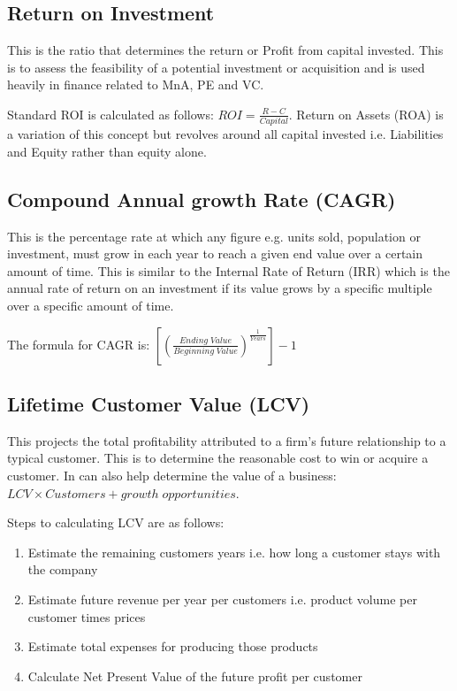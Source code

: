 \documentclass[a4paper]{article}
\begin{document}
{\subsection{Return on Investment}
This is the ratio that determines the return or Profit from capital invested. This is to assess the feasibility of a potential investment or acquisition and is used heavily in finance related to MnA, PE and VC.

\vspace{5pt}
\noindent Standard ROI is calculated as follows: $ROI = \frac{R-C}{Capital}$. Return on Assets (ROA) is a variation of this concept but revolves around all capital invested i.e. Liabilities and Equity rather than equity alone.

\subsection{Compound Annual growth Rate (CAGR)}
This is the percentage rate at which any figure e.g. units sold, population or investment, must grow in each year to reach a given end value over a certain amount of time. This is similar to the Internal Rate of Return (IRR) which is the annual rate of return on an investment if its value grows by a specific multiple over a specific amount of time.

\vspace{5pt}
\noindent The formula for CAGR is: $[(\frac{Ending\; Value}{Beginning\; Value})^{\frac{1}{Years}}]-1$

\subsection{Lifetime Customer Value (LCV)}
This projects the total profitability attributed to a firm's future relationship to a typical customer. This is to determine the reasonable cost to win or acquire a customer. In can also help determine the value of a business: $LCV \times Customers + growth\; opportunities$.

\vspace{5pt}
\noindent Steps to calculating LCV are as follows:
\begin{enumerate}
	\item Estimate the remaining customers years i.e. how long a customer stays with the company
	\item Estimate future revenue per year per customers i.e. product volume per customer times prices
	\item Estimate total expenses for producing those products
	\item Calculate Net Present Value of the future profit per customer
\end{enumerate}

}
\end{document}
